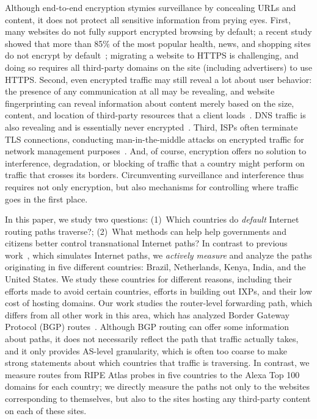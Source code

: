 Although end-to-end encryption stymies surveillance by concealing URLs
and content, it does not protect all sensitive information from prying
eyes. First, many websites do not fully support encrypted browsing by
default; a recent study showed that more than 85\% of the most popular
health, news, and shopping sites do not encrypt by
default~\cite{what_isps_can_see}; migrating a website to HTTPS is
challenging, and doing so requires all third-party domains on the site
(including advertisers) to use HTTPS.  Second, even encrypted traffic
may still reveal a lot about user behavior: the presence of any
communication at all may be revealing, and website fingerprinting can
reveal information about content merely based on the size, content, and
location of third-party resources that a client loads~\cite{Johnson2013a}. DNS traffic is
also revealing and is essentially never
encrypted~\cite{what_isps_can_see}.  Third, ISPs often terminate TLS
connections, conducting man-in-the-middle attacks on encrypted traffic
for network management purposes~\cite{mitm_isp}.  And, of course,
encryption offers no solution to interference, degradation, or blocking
of traffic that a country might perform on traffic that crosses its
borders.  Circumventing surveillance and interference thus requires not
only encryption, but also mechanisms for controlling where traffic goes
in the first place.

In this paper, we study two questions: (1)~Which countries do {\em
  default} Internet routing paths traverse?; (2)~What methods can help
help governments and citizens
better control transnational Internet paths?  In contrast to previous
work~\cite{karlin2009nation}, which simulates Internet paths, we
\textit{actively measure} and analyze the paths originating in five
different countries: Brazil, Netherlands, Kenya, India, and the United
States.  We study these countries for different reasons, including their
efforts made to avoid certain countries, efforts in building out IXPs,
and their low cost of hosting domains.  Our work studies the
router-level forwarding path, which differs from all other work in this
area, which has analyzed Border Gateway Protocol
(BGP) routes~\cite{karlin2009nation,shah2015characterizing}.  Although
BGP routing can offer some information about paths, it does not
necessarily reflect the path that traffic actually takes, and it only
provides AS-level granularity, which is often too coarse to make strong
statements about which countries that traffic is traversing.  In
contrast, we measure routes from RIPE Atlas probes in five
countries to the Alexa Top 100 domains for each country; we directly
measure the paths not only to the websites corresponding to
themselves, but also to the sites hosting any third-party content on
each of these sites.


